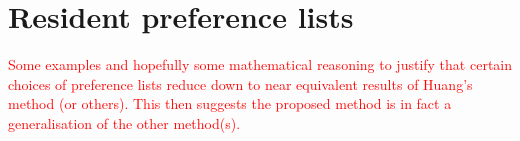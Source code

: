 \section{Resident preference lists}\label{sec:preferences}

\textcolor{red}{%
    Some examples and hopefully some mathematical reasoning to justify that
    certain choices of preference lists reduce down to near equivalent results
    of Huang's method (or others). This then suggests the proposed method is in
    fact a generalisation of the other method(s).
}
